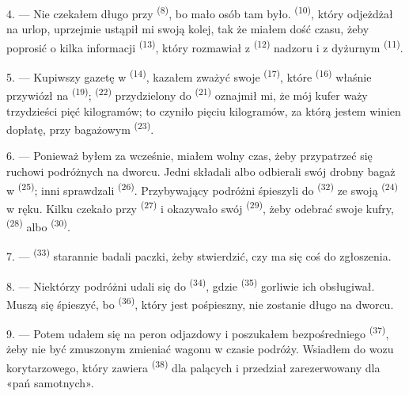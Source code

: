 4. --- Nie czekałem długo przy  \textsuperscript{(8)}, bo mało osób tam
było.  \textsuperscript{(10)}, który odjeżdżał na urlop, uprzejmie
ustąpił mi swoją kolej, tak że miałem dość czasu, żeby poprosić o kilka informacji
 \textsuperscript{(13)}, który rozmawiał z 
\textsuperscript{(12)} nadzoru i z dyżurnym  \textsuperscript{(11)}.

\VUsaut{3.0mm}

5. --- Kupiwszy gazetę w  \textsuperscript{(14)}, kazałem zważyć swoje
 \textsuperscript{(17)}, które  \textsuperscript{(16)}
właśnie przywiózł na  \textsuperscript{(19)}; 
\textsuperscript{(22)} przydzielony do  \textsuperscript{(21)} oznajmił mi,
że mój kufer waży trzydzieści pięć kilogramów; to czyniło  pięciu
kilogramów, za którą jestem winien dopłatę, przy  bagażowym
\textsuperscript{(23)}.

6. --- Ponieważ byłem za wcześnie, miałem wolny czas, żeby przypatrzeć się ruchowi
podróżnych na dworcu. Jedni składali albo odbierali swój drobny bagaż w
 \textsuperscript{(25)}; inni sprawdzali  \textsuperscript{(26)}. Przybywający podróżni śpieszyli do 
\textsuperscript{(32)} ze swoją  \textsuperscript{(24)} w ręku. Kilku
czekało przy  \textsuperscript{(27)} i okazywało swój
 \textsuperscript{(29)}, żeby odebrać swoje kufry, 
\textsuperscript{(28)} albo  \textsuperscript{(30)}.

7. ---  \textsuperscript{(33)} starannie badali paczki, żeby
stwierdzić, czy ma się coś do zgłoszenia.

8. --- Niektórzy podróżni udali się do  \textsuperscript{(34)}, gdzie
 \textsuperscript{(35)} gorliwie ich obsługiwał. Muszą się śpieszyć, bo
 \textsuperscript{(36)}, który jest pośpieszny, nie zostanie długo na
dworcu.

9. --- Potem udałem się na peron odjazdowy i poszukałem bezpośredniego 
\textsuperscript{(37)}, żeby nie być zmuszonym zmieniać wagonu w czasie podróży.
Wsiadłem do wozu korytarzowego, który zawiera 
\textsuperscript{(38)} dla palących i przedział zarezerwowany dla «pań samotnych».

